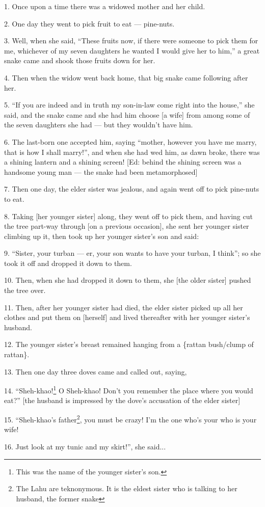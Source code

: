 \setcounter{footnote}{0}

1. Once upon a time there was a widowed mother and her child.

2. One day they went to pick fruit to eat --- pine-nuts.

3. Well, when she said, ``These fruits now, if there were someone to pick them for
me, whichever of my seven daughters he wanted I would give her to him,'' a great
snake came and shook those fruits down for her.

4. Then when the widow went back home, that big snake came following after her.

5. ``If you are indeed and in truth my son-in-law come right into the house,'' she
said, and the snake came and she had him choose [a wife] from among some of the
seven daughters she had --- but they wouldn't have him.

6. The last-born one accepted him, saying ``mother, however you have me marry, that
is how I shall marry!'', and when she had wed him, as dawn broke, there was a shining
lantern and a shining screen! [Ed: behind the shining screen was a handsome young
man --- the snake had been metamorphosed]

7. Then one day, the elder sister was jealous, and again went off to pick pine-nuts
to eat.

8. Taking [her younger sister] along, they went off to pick them, and having cut
the tree part-way through [on a previous occasion], she sent her younger sister
climbing up it, then took up her younger sister's son and said:

9. ``Sister, your turban --- er, your son wants to have your turban, I think'';
so she took it off and dropped it down to them.

10. Then, when she had dropped it down to them, she [the older sister] pushed the
tree over.

11. Then, after her younger sister had died, the elder sister picked up all her
clothes and put them on [herself] and lived thereafter with her younger sister's
husband.

12. The younger sister's breast remained hanging from a \{rattan bush/clump of rattan\}.

13. Then one day three doves came and called out, saying,

14. ``Sheh-khao!\footnote{This was the name of the younger sister's son.} O Sheh-khao! Don't you remember the place where you would eat?''
[the husband is impressed by the dove's accusation of the elder sister]

15. ``Sheh-khao's father\footnote{The Lahu are teknonymous. It is the eldest sister who is talking to her husband, the former snake}, you must be crazy! I'm the one who's your who is your
wife!

16. Just look at my tunic and my skirt!'', she said...

